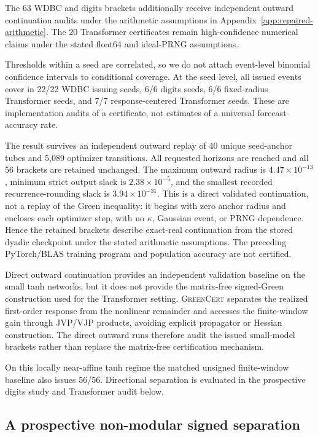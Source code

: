 \documentclass{article}
\newcommand{\method}{\textsc{GreenCert}}
\begin{document}
The 63 WDBC and digits brackets additionally receive independent outward
continuation audits under the arithmetic assumptions in
Appendix~\ref{app:repaired-arithmetic}.  The 20 Transformer certificates remain high-confidence
numerical claims under the stated float64 and ideal-PRNG assumptions.

Thresholds within a seed are correlated, so we do not attach event-level
binomial confidence intervals to conditional coverage.  At the seed level,
all issued events cover in 22/22 WDBC issuing seeds, 6/6 digits seeds, 6/6
fixed-radius Transformer seeds, and 7/7 response-centered Transformer seeds.
These are implementation audits of a certificate, not estimates of a universal
forecast-accuracy rate.

The result survives an independent outward replay of 40 unique
seed-anchor tubes and 5,089 optimizer transitions.  All requested horizons are
reached and all 56 brackets are retained unchanged.  The maximum outward
radius is $4.47\times10^{-13}$, minimum strict output slack is
$2.38\times10^{-5}$, and the smallest recorded recurrence-rounding slack is
$3.94\times10^{-31}$.  This is a direct validated continuation, not a replay
of the Green inequality: it begins with zero anchor radius and encloses each
optimizer step, with no $\kappa$, Gaussian event, or PRNG dependence.  Hence
the retained brackets describe exact-real continuation from the stored dyadic
checkpoint under the stated arithmetic assumptions.  The preceding
PyTorch/BLAS training program and population accuracy are not certified.

Direct outward continuation provides an independent validation baseline on
the small tanh networks, but it
does not provide the matrix-free signed-Green construction used for the
Transformer setting.  \method{} separates the realized first-order response
from the nonlinear remainder and accesses the finite-window gain through
JVP/VJP products, avoiding explicit propagator or Hessian construction.  The
direct outward runs therefore audit the issued small-model brackets rather
than replace the matrix-free certification mechanism.

On this locally near-affine tanh regime the matched unsigned finite-window
baseline also issues 56/56.  Directional separation is evaluated in the
prospective digits study and Transformer audit below.

\subsection{A prospective non-modular signed separation}
\end{document}
